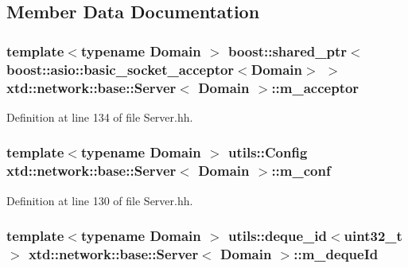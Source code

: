 \subsection{Member Data Documentation}
\subsubsection[{\texorpdfstring{m\+\_\+acceptor}{m_acceptor}}]{\setlength{\rightskip}{0pt plus 5cm}template$<$typename Domain $>$ boost\+::shared\+\_\+ptr$<$boost\+::asio\+::basic\+\_\+socket\+\_\+acceptor$<$Domain$>$ $>$ {\bf xtd\+::network\+::base\+::\+Server}$<$ Domain $>$\+::m\+\_\+acceptor\hspace{0.3cm}{\ttfamily [protected]}}\hypertarget{classxtd_1_1network_1_1base_1_1Server_a03e4c0a664c471e756217b20b2209980}{}\label{classxtd_1_1network_1_1base_1_1Server_a03e4c0a664c471e756217b20b2209980}


Definition at line 134 of file Server.\+hh.

\subsubsection[{\texorpdfstring{m\+\_\+conf}{m_conf}}]{\setlength{\rightskip}{0pt plus 5cm}template$<$typename Domain $>$ {\bf utils\+::\+Config} {\bf xtd\+::network\+::base\+::\+Server}$<$ Domain $>$\+::m\+\_\+conf\hspace{0.3cm}{\ttfamily [protected]}}\hypertarget{classxtd_1_1network_1_1base_1_1Server_a5465aab6a4cbdaa664eeaf9eef6da5ac}{}\label{classxtd_1_1network_1_1base_1_1Server_a5465aab6a4cbdaa664eeaf9eef6da5ac}


Definition at line 130 of file Server.\+hh.

\subsubsection[{\texorpdfstring{m\+\_\+deque\+Id}{m_dequeId}}]{\setlength{\rightskip}{0pt plus 5cm}template$<$typename Domain $>$ {\bf utils\+::deque\+\_\+id}$<$uint32\+\_\+t$>$ {\bf xtd\+::network\+::base\+::\+Server}$<$ Domain $>$\+::m\+\_\+deque\+Id\hspace{0.3cm}{\ttfamily [protected]}}\hypertarget{classxtd_1_1network_1_1base_1_1Server_a5092eab162e1e793aaeac42368c5c06f}{}\label{classxtd_1_1network_1_1base_1_1Server_a5092eab162e1e793aaeac42368c5c06f}


